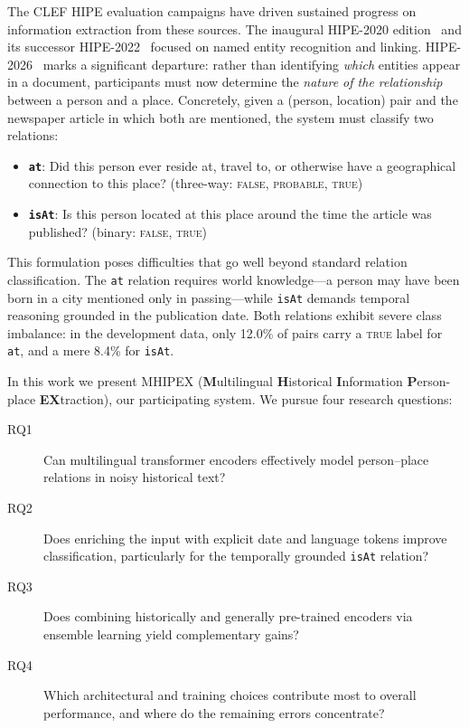 \documentclass[runningheads]{llncs}
\begin{document}
The CLEF HIPE evaluation campaigns have driven sustained progress on information extraction from these sources. The inaugural HIPE-2020 edition~\cite{ehrmann2020} and its successor HIPE-2022~\cite{ehrmann2022} focused on named entity recognition and linking. HIPE-2026~\cite{opitz2026} marks a significant departure: rather than identifying \emph{which} entities appear in a document, participants must now determine the \emph{nature of the relationship} between a person and a place. Concretely, given a (person, location) pair and the newspaper article in which both are mentioned, the system must classify two relations:
\begin{itemize}
    \item \textbf{\texttt{at}}: Did this person ever reside at, travel to, or otherwise have a geographical connection to this place? (three-way: \textsc{false}, \textsc{probable}, \textsc{true})
    \item \textbf{\texttt{isAt}}: Is this person located at this place around the time the article was published? (binary: \textsc{false}, \textsc{true})
\end{itemize}

This formulation poses difficulties that go well beyond standard relation classification. The \texttt{at} relation requires world knowledge---a person may have been born in a city mentioned only in passing---while \texttt{isAt} demands temporal reasoning grounded in the publication date. Both relations exhibit severe class imbalance: in the development data, only 12.0\% of pairs carry a \textsc{true} label for \texttt{at}, and a mere 8.4\% for \texttt{isAt}.

In this work we present MHIPEX (\textbf{M}ultilingual \textbf{H}istorical \textbf{I}nformation \textbf{P}erson-place \textbf{EX}traction), our participating system. We pursue four research questions:

\begin{description}
    \item[RQ1] Can multilingual transformer encoders effectively model person--place relations in noisy historical text?
    \item[RQ2] Does enriching the input with explicit date and language tokens improve classification, particularly for the temporally grounded \texttt{isAt} relation?
    \item[RQ3] Does combining historically and generally pre-trained encoders via ensemble learning yield complementary gains?
    \item[RQ4] Which architectural and training choices contribute most to overall performance, and where do the remaining errors concentrate?
\end{description}
\end{document}
